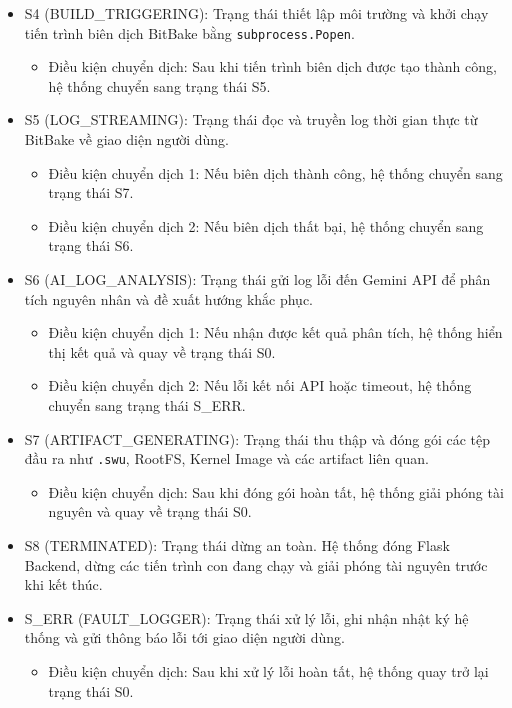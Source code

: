 \begin{itemize}
    \item S4 (BUILD\_TRIGGERING): Trạng thái thiết lập môi trường và khởi chạy tiến trình biên dịch BitBake bằng \texttt{subprocess.Popen}.

    \begin{itemize}
        \item Điều kiện chuyển dịch: Sau khi tiến trình biên dịch được tạo thành công, hệ thống chuyển sang trạng thái S5.
    \end{itemize}

    \item S5 (LOG\_STREAMING): Trạng thái đọc và truyền log thời gian thực từ BitBake về giao diện người dùng.

    \begin{itemize}
        \item Điều kiện chuyển dịch 1: Nếu biên dịch thành công, hệ thống chuyển sang trạng thái S7.
        \item Điều kiện chuyển dịch 2: Nếu biên dịch thất bại, hệ thống chuyển sang trạng thái S6.
    \end{itemize}

    \item S6 (AI\_LOG\_ANALYSIS): Trạng thái gửi log lỗi đến Gemini API để phân tích nguyên nhân và đề xuất hướng khắc phục.

    \begin{itemize}
        \item Điều kiện chuyển dịch 1: Nếu nhận được kết quả phân tích, hệ thống hiển thị kết quả và quay về trạng thái S0.
        \item Điều kiện chuyển dịch 2: Nếu lỗi kết nối API hoặc timeout, hệ thống chuyển sang trạng thái S\_ERR.
    \end{itemize}

    \item S7 (ARTIFACT\_GENERATING): Trạng thái thu thập và đóng gói các tệp đầu ra như \texttt{.swu}, RootFS, Kernel Image và các artifact liên quan.

    \begin{itemize}
        \item Điều kiện chuyển dịch: Sau khi đóng gói hoàn tất, hệ thống giải phóng tài nguyên và quay về trạng thái S0.
    \end{itemize}

    \item S8 (TERMINATED): Trạng thái dừng an toàn. Hệ thống đóng Flask Backend, dừng các tiến trình con đang chạy và giải phóng tài nguyên trước khi kết thúc.

    \item S\_ERR (FAULT\_LOGGER): Trạng thái xử lý lỗi, ghi nhận nhật ký hệ thống và gửi thông báo lỗi tới giao diện người dùng.

    \begin{itemize}
        \item Điều kiện chuyển dịch: Sau khi xử lý lỗi hoàn tất, hệ thống quay trở lại trạng thái S0.
    \end{itemize}

\end{itemize}
